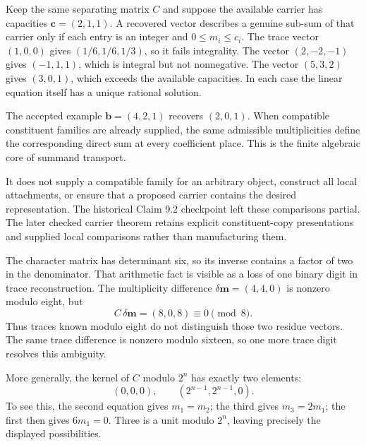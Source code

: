 Keep the same separating matrix $C$ and suppose the available carrier has capacities $\bm c=(2,1,1)$. A recovered vector describes a genuine sub-sum of that carrier only if each entry is an integer and $0\le m_i\le c_i$.
The trace vector $(1,0,0)$ gives $(1/6,1/6,1/3)$, so it fails integrality. The vector $(2,-2,-1)$ gives $(-1,1,1)$, which is integral but not nonnegative. The vector $(5,3,2)$ gives $(3,0,1)$, which exceeds the available capacities. In each case the linear equation itself has a unique rational solution.

The accepted example $\bm b=(4,2,1)$ recovers $(2,0,1)$. When compatible constituent families are already supplied, the same admissible multiplicities define the corresponding direct sum at every coefficient place. This is the finite algebraic core of summand transport.

It does not supply a compatible family for an arbitrary object, construct all local attachments, or ensure that a proposed carrier contains the desired representation. The historical Claim 9.2 checkpoint left these comparisons partial. The later checked carrier theorem retains explicit constituent-copy presentations and supplied local comparisons rather than manufacturing them.

The character matrix has determinant six, so its inverse contains a factor of two in the denominator. That arithmetic fact is visible as a loss of one binary digit in trace reconstruction.
The multiplicity difference $\delta\bm m=(4,4,0)$ is nonzero modulo eight, but
\[
C\,\delta\bm m=(8,0,8)\equiv0\pmod8.
\]
Thus traces known modulo eight do not distinguish those two residue vectors. The same trace difference is nonzero modulo sixteen, so one more trace digit resolves this ambiguity.

More generally, the kernel of $C$ modulo $2^n$ has exactly two elements:
\[
(0,0,0),\qquad(2^{n-1},2^{n-1},0).
\]
To see this, the second equation gives $m_1=m_2$; the third gives $m_3=2m_1$; the first then gives $6m_1=0$. Three is a unit modulo $2^n$, leaving precisely the displayed possibilities.

